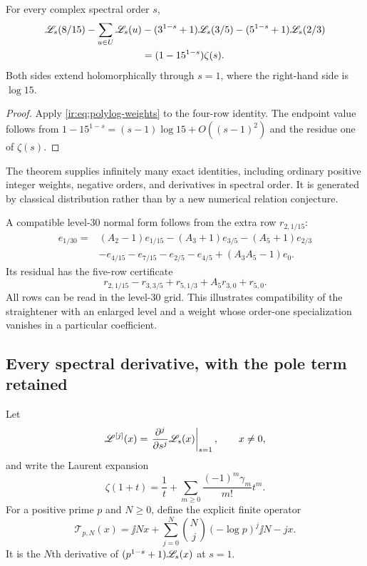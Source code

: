 \begin{theorem}
\label{ir:thm:level15}
For every complex spectral order $s$,
\begin{align}
 \mathscr L_{s}(8/15)-\sum_{u\in U}\mathscr L_{s}(u)
 &-(3^{1-s}+1)\mathscr L_{s}(3/5)
  -(5^{1-s}+1)\mathscr L_{s}(2/3)\nonumber\\
 &=(1-15^{1-s})\zeta(s).
 \label{ir:eq:level15}
\end{align}
Both sides extend holomorphically through $s=1$, where the right-hand
side is $\log15$.
\end{theorem}
\begin{proof}
Apply \eqref{ir:eq:polylog-weights} to the four-row identity.
The endpoint value follows from
$1-15^{1-s}=(s-1)\log15+O((s-1)^2)$ and the residue one of
$\zeta(s)$.
\end{proof}
The theorem supplies infinitely many exact identities, including
ordinary positive integer weights, negative orders, and derivatives
in spectral order. It is generated by classical distribution rather
than by a new numerical relation conjecture.

A compatible level-$30$ normal form follows from the extra row
$r_{2,1/15}$:
\begin{align}
 e_{1/30}={}&(A_2-1)e_{1/15}-(A_3+1)e_{3/5}
 -(A_5+1)e_{2/3}\nonumber\\
 &-e_{4/15}-e_{7/15}-e_{2/5}-e_{4/5}
 +(A_3A_5-1)e_0.\label{ir:eq:level30-normal}
\end{align}
Its residual has the five-row certificate
\[
 r_{2,1/15}-r_{3,3/5}+r_{5,1/3}+A_5r_{3,0}+r_{5,0}.
\]
All rows can be read in the level-$30$ grid. This illustrates
compatibility of the straightener with an enlarged level and a
weight whose order-one specialization vanishes in a particular
coefficient.

\subsection{Every spectral derivative, with the pole term retained}
Let
\[
 \mathscr L^{[j]}(x)=\left.\frac{\partial^j}{\partial s^j}\mathscr L_{s}(x)
                   \right|_{s=1},\qquad x\ne0,
\]
and write the Laurent expansion
\begin{equation}\label{ir:eq:stieltjes}
 \zeta(1+t)=\frac1t+\sum_{m\ge0}\frac{(-1)^m\gamma_m}{m!}t^m.
\end{equation}
For a positive prime $p$ and $N\ge0$, define the explicit finite operator
\begin{equation}\label{ir:eq:T-operator}
 \mathcal T_{p,N}(x)=\jj{N}{x}
 +\sum_{j=0}^{N}\binom Nj(-\log p)^j\jj{N-j}{x}.
\end{equation}
It is the $N$th derivative of
$(p^{1-s}+1)\mathscr L_{s}(x)$ at $s=1$.

